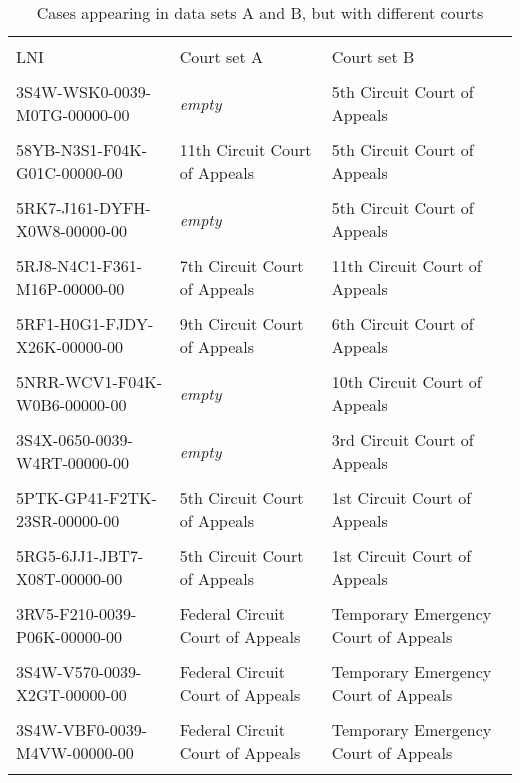 \documentclass[10pt, letterpaper]{article}
\begin{document}
\begin{spacing}{1.0}
\begin{table}[H]
    \centering
    \caption{Cases appearing in data sets A and B, but with different courts}
    \footnotesize
    \begin{tabular}{llp{2.25in}}
        \hline\\[-6pt]
        LNI & Court set A & Court set B\\[4pt]
        \hline\\[-6pt]
        3S4W-WSK0-0039-M0TG-00000-00 & \textit{empty} & 5th Circuit Court of Appeals\\\\[-4pt]
        58YB-N3S1-F04K-G01C-00000-00 & 11th Circuit Court of Appeals & 5th Circuit Court of Appeals\\\\[-4pt]
        5RK7-J161-DYFH-X0W8-00000-00 & \textit{empty} & 5th Circuit Court of Appeals\\\\[-4pt]
        5RJ8-N4C1-F361-M16P-00000-00 & 7th Circuit Court of Appeals & 11th Circuit Court of Appeals\\\\[-4pt]
        5RF1-H0G1-FJDY-X26K-00000-00 & 9th Circuit Court of Appeals & 6th Circuit Court of Appeals\\\\[-4pt]
        5NRR-WCV1-F04K-W0B6-00000-00 & \textit{empty} & 10th Circuit Court of Appeals\\\\[-4pt]
        3S4X-0650-0039-W4RT-00000-00 & \textit{empty} & 3rd Circuit Court of Appeals\\\\[-4pt]
        5PTK-GP41-F2TK-23SR-00000-00 & 5th Circuit Court of Appeals & 1st Circuit Court of Appeals\\\\[-4pt]
        5RG5-6JJ1-JBT7-X08T-00000-00 & 5th Circuit Court of Appeals & 1st Circuit Court of Appeals\\\\[-4pt]
        3RV5-F210-0039-P06K-00000-00 & Federal Circuit Court of Appeals & Temporary Emergency Court of Appeals\\\\[-4pt]
        3S4W-V570-0039-X2GT-00000-00 & Federal Circuit Court of Appeals & Temporary Emergency Court of Appeals\\\\[-4pt]
        3S4W-VBF0-0039-M4VW-00000-00 & Federal Circuit Court of Appeals & Temporary Emergency Court of Appeals\\\\[-4pt]

\end{tabular}
\end{table}
\end{spacing}
\end{document}
